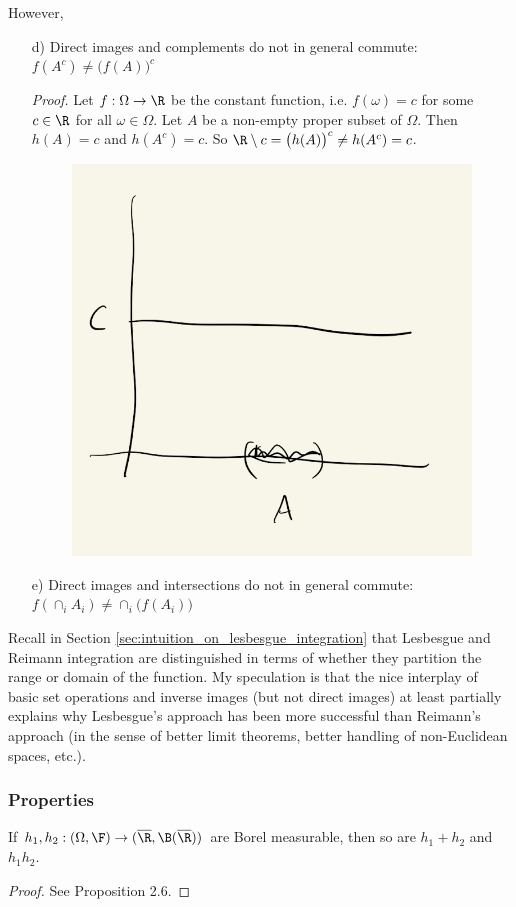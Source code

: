 \documentclass{article} %
\begin{document}
However, 
\begin{itemize}
\item[d)] Direct images and complements do not in general commute: $f(A^c) \neq \big(f(A)\big)^c$	

\textit{Proof.} Let $f : \Omega \to \R$ be the constant function, i.e. $f(\omega) = c$ for some $c \in \R$ for all $\omega \in \Omega$.  Let $A$ be a non-empty proper subset of $\Omega$.  Then $h(A) = c$ and $h(A^c) = c$.  So $\R \setminus c = \big(h(A)\big)^c \neq  h(A^c) = c$.

\begin{figure}[H]
\centering
\includegraphics[width=.25\textwidth]{images/direct_images_and_complements}	
\end{figure}


\item[e)] Direct images and intersections do not in general commute: $f(\cap_i A_i) \neq \cap_i \big(f(A_i)\big)$	
\end{itemize}

Recall in Section \ref{sec:intuition_on_lesbesgue_integration} that Lesbesgue and Reimann integration are distinguished in terms of whether they partition the range or domain of the function.  My speculation is that the nice interplay of basic set operations and inverse images (but not direct images) at least partially explains why Lesbesgue's approach has been more successful than Reimann's approach (in the sense of better limit theorems, better handling of non-Euclidean spaces, etc.).

\subsubsection{Properties}

\begin{proposition}
If $h_1, h_2 : (\Omega, \F) \to (\overline{\R}, \B(\overline{\R}))$ are Borel measurable, then so are $h_1 + h_2$ and $h_1 h_2$.  
\label{prop:borel_measurability_closed_under_multiplication_and_addition}
\end{proposition}

\begin{proof}
See \cite{folland1999real} Proposition 2.6.
\end{proof}
\end{document}
